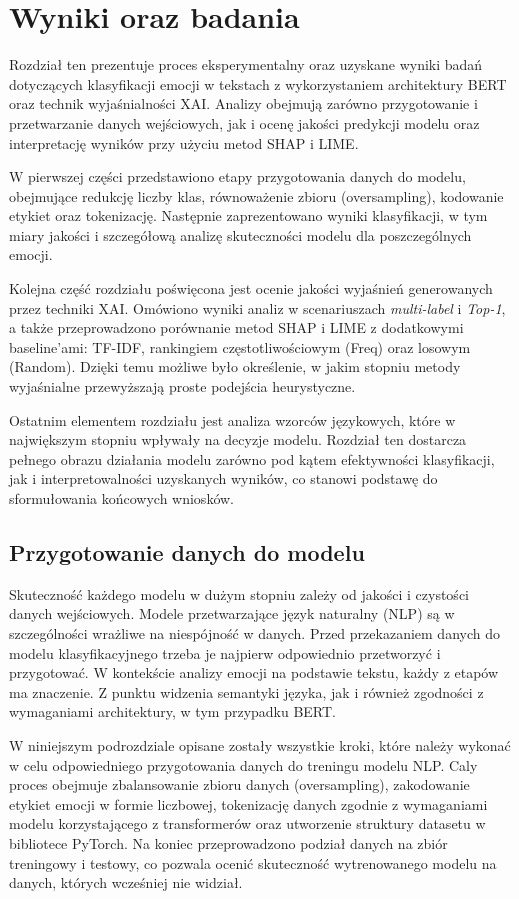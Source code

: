 \documentclass[wmii, inf, mgr]{uwmthesis}
\begin{document}
\chapter{Wyniki oraz badania}
Rozdział ten prezentuje proces eksperymentalny oraz uzyskane wyniki badań dotyczących klasyfikacji emocji w tekstach z wykorzystaniem architektury BERT oraz technik wyjaśnialności XAI. Analizy obejmują zarówno przygotowanie i przetwarzanie danych wejściowych, jak i ocenę jakości predykcji modelu oraz interpretację wyników przy użyciu metod SHAP i LIME.  

W pierwszej części przedstawiono etapy przygotowania danych do modelu, obejmujące redukcję liczby klas, równoważenie zbioru (oversampling), kodowanie etykiet oraz tokenizację. Następnie zaprezentowano wyniki klasyfikacji, w tym miary jakości i szczegółową analizę skuteczności modelu dla poszczególnych emocji.  

Kolejna część rozdziału poświęcona jest ocenie jakości wyjaśnień generowanych przez techniki XAI. Omówiono wyniki analiz w scenariuszach \textit{multi-label} i \textit{Top-1}, a także przeprowadzono porównanie metod SHAP i LIME z dodatkowymi baseline’ami: TF-IDF, rankingiem częstotliwościowym (Freq) oraz losowym (Random). Dzięki temu możliwe było określenie, w jakim stopniu metody wyjaśnialne przewyższają proste podejścia heurystyczne.  

Ostatnim elementem rozdziału jest analiza wzorców językowych, które w największym stopniu wpływały na decyzje modelu. Rozdział ten dostarcza pełnego obrazu działania modelu zarówno pod kątem efektywności klasyfikacji, jak i interpretowalności uzyskanych wyników, co stanowi podstawę do sformułowania końcowych wniosków.

\section{Przygotowanie danych do modelu}
Skuteczność każdego modelu w dużym stopniu zależy od jakości i czystości danych wejściowych. Modele przetwarzające język naturalny (NLP) są w szczególności wrażliwe na niespójność w danych. Przed przekazaniem danych do modelu klasyfikacyjnego trzeba je najpierw odpowiednio przetworzyć i przygotować. W kontekście analizy emocji na podstawie tekstu, każdy z etapów ma znaczenie. Z punktu widzenia semantyki języka, jak i również zgodności z~ wymaganiami architektury, w tym przypadku BERT. 

W niniejszym podrozdziale opisane zostały wszystkie kroki, które należy wykonać w celu odpowiedniego przygotowania danych do treningu modelu NLP. Caly proces obejmuje zbalansowanie zbioru danych (oversampling), zakodowanie etykiet emocji w formie liczbowej, tokenizację danych zgodnie z wymaganiami modelu korzystającego z transformerów oraz utworzenie struktury datasetu w bibliotece PyTorch. Na koniec przeprowadzono podział danych na zbiór treningowy i testowy, co pozwala ocenić skuteczność wytrenowanego modelu na danych, których wcześniej nie widział.
\end{document}
